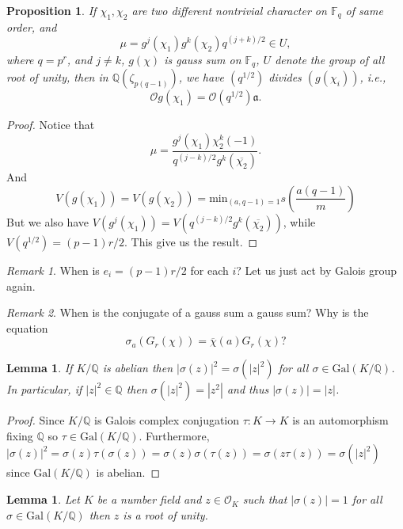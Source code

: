 \documentclass{article}
\newcommand{\Q}{\mathbb{Q}}
\newcommand{\F}{\mathbb{F}}
\newcommand{\iO}{\mathcal{O}}
\newcommand{\ia}{\mathfrak{a}}
\newcommand{\Gal}[0]{\mathrm{Gal}}
\newcommand{\s}[1]{s\left( #1 \right)}
\newtheorem{lemma}[theorem]{Lemma}
\newtheorem{proposition}[theorem]{Proposition}
\theoremstyle{definition}
\theoremstyle{definition}
\theoremstyle{remark}
\newtheorem*{remark}{Remark}
\begin{document}
\begin{proposition}
If $\chi_1, \chi_2$ are two different nontrivial character on $\F_q$ of same order, and \[\mu = g^j(\chi_1)g^k(\chi_2)q^{(j+k)/2} \in U,\] where $q = p^r$, and $j \ne k$, $g(\chi)$ is gauss sum on $\F_q$, $U$ denote the group of all root of unity, then in $\Q(\zeta_{p(q-1)})$, we have $(q^{1/2})$ divides $(g(\chi_i))$, i.e., 
\[\iO g(\chi_1) = \iO(q^{1/2}) \ia.\]
\end{proposition}
\begin{proof}
Notice that \[\mu = \frac{g^j(\chi_1)  \chi_2^k(-1)}{q^{(j-k)/2}g^k(\overline{\chi_2})}.\] And \[V(g(\chi_1)) = V(g(\chi_2)) = \text{min}_{(a,q-1) = 1} \s{\frac{a(q-1)}{m}}\] But we also have $V(g^j(\chi_1)) = V(q^{(j-k)/2}g^k(\overline{\chi_2}))$, while $V(q^{1/2}) = (p-1)r/2$. This give us the result.
\end{proof}
\begin{remark}
When is $e_i = (p-1)r/2$ for each $i$? Let us just act by Galois group again. 
\end{remark}
\begin{remark}
When is the conjugate of a gauss sum a gauss sum?
Why is the equation \[\sigma_a(G_r(\chi)) = \overline{\chi}(a) G_r(\chi) ?\]
\end{remark}

\begin{lemma}
If $K/\Q$ is abelian then $|\sigma(z)|^2 = \sigma(|z|^2)$ for all $\sigma \in \Gal(K/\Q)$. In particular, if $|z|^2 \in \Q$ then $\sigma(|z|^2) = |z^2|$ and thus $|\sigma(z)| = |z|$.
\end{lemma}

\begin{proof}
Since $K/\Q$ is Galois complex conjugation $\tau : K \to K$ is an automorphism fixing $\Q$ so $\tau \in \Gal(K/\Q)$. Furthermore, $|\sigma(z)|^2 = \sigma(z) \tau(\sigma(z)) = \sigma(z) \sigma(\tau(z)) = \sigma(z \tau(z)) = \sigma(|z|^2)$ since $\Gal(K/\Q)$ is abelian. 
\end{proof}

\begin{lemma} \label{lem:all_conjugates_one_then_rootofunity}
Let $K$ be a number field and $z \in \iO_K$ such that $|\sigma(z)| = 1$ for all $\sigma \in \Gal(K/\Q)$ then $z$ is a root of unity.
\end{lemma}
\end{document}
